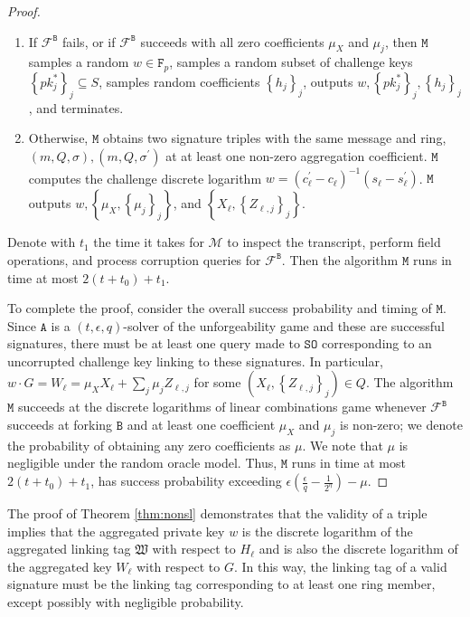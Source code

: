 \documentclass{llncs}
\newcommand{\A}{\texttt{A}}
\newcommand{\B}{\texttt{B}}
\newcommand{\F}{\texttt{F}_p}
\begin{document}
\begin{proof}
\begin{enumerate}[(1)]
\item If $\mathcal{F}^{\B}$ fails, or if $\mathcal{F}^{\B}$ succeeds with all zero coefficients $\mu_X$ and $\mu_j$, then $\texttt{M}$ samples a random $w \in \F$, samples a random subset of challenge keys $\left\{pk^*_j\right\}_j \subseteq S$, samples random coefficients $\left\{h_j\right\}_j$, outputs $w, \left\{pk^*_j\right\}_j, \left\{h_j\right\}_j$, and terminates.

\item Otherwise, $\texttt{M}$ obtains two signature triples with the same message and ring, $(m, Q, \sigma), (m, Q, \sigma^\prime)$ at at least one non-zero aggregation coefficient. $\texttt{M}$ computes the challenge discrete logarithm $w = (c_\ell^\prime - c_\ell)^{-1}(s_\ell - s_\ell^\prime)$. $\texttt{M}$ outputs $w, \left\{\mu_X, \left\{\mu_j\right\}_j\right\}$, and $\left\{X_\ell, \left\{Z_{\ell, j}\right\}_j\right\}$.
\end{enumerate}

Denote with $t_1$ the time it takes for $\mathcal{M}$ to inspect the transcript, perform field operations, and process corruption queries for $\mathcal{F}^{\B}$.  Then the algorithm $\texttt{M}$ runs in time at most $2(t+t_0) + t_1$.

To complete the proof, consider the overall success probability and timing of $\texttt{M}$. Since $\A$ is a $(t, \epsilon, q)$-solver of the unforgeability game and these are successful signatures, there must be at least one query made to $\texttt{SO}$ corresponding to an uncorrupted challenge key linking to these signatures. In particular, $w \cdot G = W_\ell = \mu_X X_\ell + \sum_j \mu_j Z_{\ell,j}$ for some $(X_\ell, \left\{Z_{\ell, j}\right\}_j) \in Q$. The algorithm $\texttt{M}$ succeeds at the discrete logarithms of linear combinations game whenever $\mathcal{F}^{\B}$ succeeds at forking $\B$ and at least one coefficient $\mu_X$ and $\mu_j$ is non-zero; we denote the probability of obtaining any zero coefficients as $\mu$. We note that $\mu$ is negligible under the random oracle model. Thus, $\texttt{M}$ runs in time at most $2(t+t_0) + t_1$, has success probability exceeding $\epsilon\left(\frac{\epsilon}{q} - \frac{1}{2^\eta}\right) - \mu$.
\end{proof}

The proof of Theorem \ref{thm:nonsl} demonstrates that the validity of a triple implies that the aggregated private key $w$ is the discrete logarithm of the aggregated linking tag $\mathfrak{W}$ with respect to $H_\ell$ and is also the discrete logarithm of the aggregated key $W_\ell$ with respect to $G$. In this way, the linking tag of a valid signature must be the linking tag corresponding to at least one ring member, except possibly with negligible probability.
\end{document}
